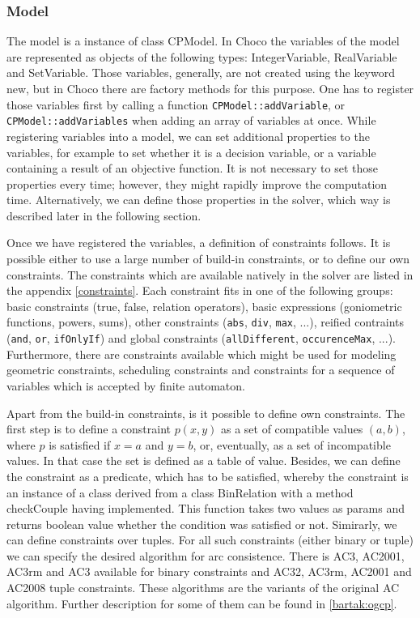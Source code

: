 \subsubsection{Model}
The model is a instance of class CPModel. In Choco the variables of the model are represented
as objects of the following types: IntegerVariable, RealVariable and SetVariable. Those 
variables, generally, are not created using the keyword new, but in Choco there are
factory methods for this purpose. One has to register those variables first by calling
a function \texttt{CPModel::addVariable}, or \texttt{CPModel::addVariables} when adding an array of variables at once.
While registering variables into a model, we can set additional properties to the variables, 
for example to set whether it is a decision variable, or a variable containing a result
of an objective function. It is not necessary to set those properties every time; however,
they might rapidly improve the computation time. Alternatively, we can define those properties
in the solver, which way is described later in the following section.

Once we have registered the variables, a definition of constraints follows. It is possible
either to use a large number of build-in constraints, or to define our own constraints.
The constraints which are available natively in the solver are listed in the appendix \ref{constraints}.
Each constraint fits in one of the following groups: basic constraints (true, false, relation operators),
basic expressions (goniometric functions, powers, sums), other constraints (\texttt{abs}, \texttt{div}, \texttt{max}, ...),
reified contraints (\texttt{and}, \texttt{or}, \texttt{ifOnlyIf}) and global constraints (\texttt{allDifferent}, 
\texttt{occurenceMax}, ...). Furthermore, there are constraints available which might be used for modeling geometric constraints,
scheduling constraints and constraints for a sequence of variables which is accepted by finite automaton.

Apart from the build-in constraints, is it possible to define own constraints. The first step is to define 
a constraint $p(x,y)$ as a set of compatible values $(a,b)$, where $p$ is satisfied
if $x=a$ and $y=b$, or, eventually, as a set of incompatible values. In that case the
set is defined as a table of value. Besides, we can define the constraint as a predicate, which has to
be satisfied, whereby the constraint is an instance of a class derived from a class BinRelation
with a method checkCouple having implemented. This function takes two values as params and 
returns boolean value whether the condition was satisfied or not. Simirarly, we can define 
constraints over tuples. For all such constraints (either binary or tuple) we can specify the 
desired algorithm for arc consistence. There is AC3, AC2001, AC3rm and AC3 available for binary constraints and
 AC32, AC3rm, AC2001 and AC2008 tuple constraints. These algorithms are the variants of
 the original AC algorithm. Further description for some of them can be found in \ref{bartak:ogcp}.


